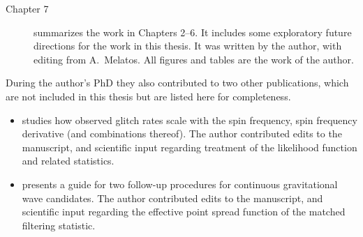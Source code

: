 \begin{description}
  \item[Chapter 7] summarizes the work in Chapters 2--6. It includes some exploratory future directions for the work in this thesis. It was written by the author, with editing from A.~Melatos. All figures and tables are the work of the author.
\end{description}

During the author's PhD they also contributed to two other publications, which are not included in this thesis but are listed here for completeness.
\begin{itemize}
  \item \citet{Millhouse2022} studies how observed glitch rates scale with the spin frequency, spin frequency derivative (and combinations thereof). The author contributed edits to the manuscript, and scientific input regarding treatment of the likelihood function and related statistics.
  \item \citet{Jones2022} presents a guide for two follow-up procedures for continuous gravitational wave candidates. The author contributed edits to the manuscript, and scientific input regarding the effective point spread function of the matched filtering statistic.
\end{itemize}